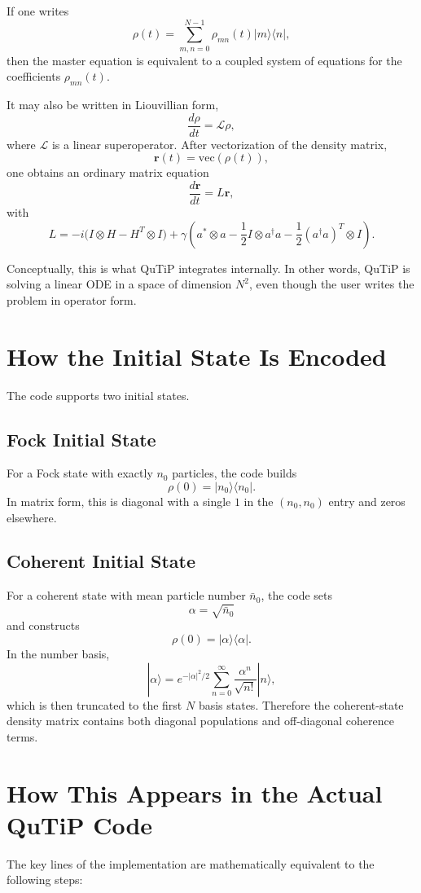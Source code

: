 \documentclass[12pt]{article}
\begin{document}
If one writes
\[
\rho(t)=\sum_{m,n=0}^{N-1}\rho_{mn}(t)|m\rangle\langle n|,
\]
then the master equation is equivalent to a coupled system of equations for the coefficients $\rho_{mn}(t)$.

It may also be written in Liouvillian form,
\[
\frac{d\rho}{dt} = \mathcal{L}\rho,
\]
where $\mathcal{L}$ is a linear superoperator. After vectorization of the density matrix,
\[
\bm{r}(t)=\mathrm{vec}(\rho(t)),
\]
one obtains an ordinary matrix equation
\[
\frac{d\bm{r}}{dt} = L\bm{r},
\]
with
\[
L
= -i\bigl(I\otimes H - H^{T}\otimes I\bigr)
+ \gamma\left(a^{*}\otimes a - \frac12 I\otimes a^\dagger a - \frac12 (a^\dagger a)^T\otimes I\right).
\]

Conceptually, this is what QuTiP integrates internally. In other words, QuTiP is solving a linear ODE in a space of dimension $N^2$, even though the user writes the problem in operator form.

\section*{How the Initial State Is Encoded}
The code supports two initial states.

\subsection*{Fock Initial State}
For a Fock state with exactly $n_0$ particles, the code builds
\[
\rho(0)=|n_0\rangle\langle n_0|.
\]
In matrix form, this is diagonal with a single $1$ in the $(n_0,n_0)$ entry and zeros elsewhere.

\subsection*{Coherent Initial State}
For a coherent state with mean particle number $\bar n_0$, the code sets
\[
\alpha = \sqrt{\bar n_0}
\]
and constructs
\[
\rho(0)=|\alpha\rangle\langle \alpha|.
\]
In the number basis,
\[
|\alpha\rangle
= e^{-|\alpha|^2/2}\sum_{n=0}^\infty \frac{\alpha^n}{\sqrt{n!}}|n\rangle,
\]
which is then truncated to the first $N$ basis states. Therefore the coherent-state density matrix contains both diagonal populations and off-diagonal coherence terms.

\section*{How This Appears in the Actual QuTiP Code}
The key lines of the implementation are mathematically equivalent to the following steps:
\end{document}
